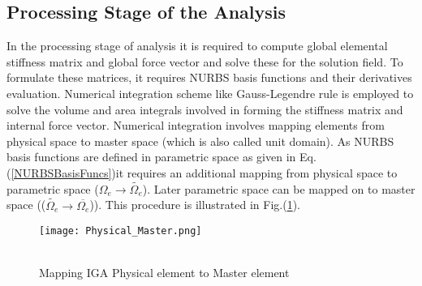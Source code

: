 \documentclass[11pt]{article}
\begin{document}
\subsection{Processing Stage of the Analysis}
In the processing stage of analysis it is required to compute global elemental
stiffness matrix and global force vector and solve these for the solution field.
To formulate these matrices, it requires NURBS basis functions and their
derivatives evaluation. Numerical integration scheme like Gauss-Legendre rule is
employed to solve the volume and area integrals involved in forming the
stiffness matrix and internal force vector. Numerical integration involves
mapping elements from physical space to master space (which is also called unit
domain). As NURBS basis functions are defined in parametric space as given in
Eq. (\ref{NURBSBasisFuncs})it requires an additional mapping from physical space to parametric space
($\Omega_e \rightarrow \widetilde{\Omega_e}$). Later parametric space can be
mapped on to master space (($\widetilde{\Omega_e} \rightarrow
\overline{\Omega_e}$)). This procedure is illustrated in
Fig.(\ref{MasterPhysical}).
\begin{figure}[H]
	\begin{center}
		\texttt{[image: Physical\_Master.png]} 
		\caption{\\Mapping IGA Physical element to Master
			element \cite{agrawal2019iga}}\label{MasterPhysical}
	\end{center}	
\end{figure}
\end{document}
